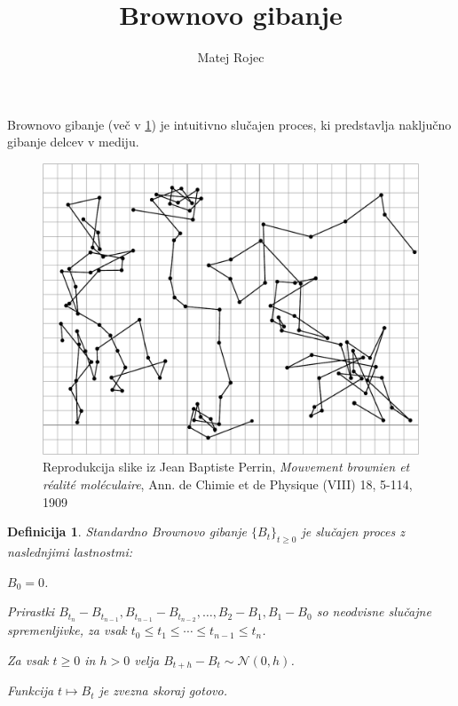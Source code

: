 \documentclass[a4paper,11pt]{article}
\title{Brownovo gibanje}
\author{Matej Rojec}
\date{}
\newtheorem{definicija}{Definicija}
\begin{document}
\maketitle

Brownovo gibanje (več v \ref{fig:PerrinPlot2}) je intuitivno slučajen proces, %
ki predstavlja naključno gibanje delcev v mediju.
    
\begin{figure}[!ht]
    \centering
    \includegraphics{PerrinPlot2.pdf}
    \caption{Reprodukcija slike iz Jean Baptiste Perrin, \emph{Mouvement brownien et réalité moléculaire}, Ann. de Chimie et de Physique (VIII) 18, 5-114, 1909}
    \label{fig:PerrinPlot2}
    \end{figure}



\begin{definicija}
    Standardno Brownovo gibanje $\{B_t\}_{t \geq 0}$ je slučajen proces z naslednjimi lastnostmi: 
    \begin{list}{label}{spacing}
        \item $B_0 = 0$.
        \item Prirastki $B_{t_n} - B_{t_{n-1}}, B_{t_{n-1}} - B_{t_{n-2}}, \ldots, B_2 - B_1, B_1 - B_0$ so neodvisne slučajne spremenljivke, za vsak $t_0 \leq t_1 \leq \cdots \leq t_{n-1} \leq t_n$.
        \item Za vsak $t \geq 0$ in $h > 0$ velja $B_{t+h} - B_t \sim \mathcal{N}(0, h)$.
        \item Funkcija $t \mapsto B_t$ je zvezna skoraj gotovo.
    \end{list}

\end{definicija}
\end{document}
